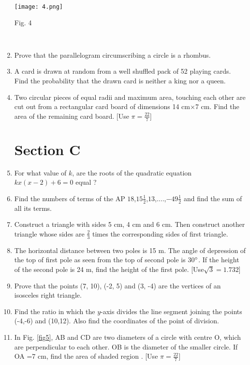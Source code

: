 \documentclass[journal,12pt,twocolumn]{IEEEtran}
\renewcommand\thesection{\arabic{section}}
\begin{document}
\begin{enumerate}[label=\thesection.\arabic*.,ref=\thesection.\theenumi]
\texttt{[image: 4.png]}\\{\centering
\caption{Fig. 4}\\}
\label{fig4}
\item Prove that the parallelogram circumscribing a circle is a rhombus.
\item A card is drawn at random from a well shuffled pack of 52 playing cards. Find the probability that the drawn card is neither a king nor a queen.
\item Two circular pieces of equal radii and maximum area, touching each other are cut out from a rectangular card board of dimensions 14 cm$\times$7 cm. Find the area of the remaining card board. [Use $\pi = \frac{22}{7}$]
\section{Section C}
\item For what value of $k$, are the roots of the quadratic equation $kx (x-2) + 6 = 0$ equal ?
\item Find the numbers of terms of the AP $18$,$15\frac{1}{2}$,$13$,....,$-49\frac{1}{2}$ and find the sum of all its terms.
\item Construct a triangle with sides 5 cm, 4 cm and 6 cm. Then construct another triangle whose sides are $\frac{2}{3}$ times the corresponding sides of first triangle.
\item The horizontal distance between two poles is 15 m. The angle of depression of the top of first pole as seen from the top of second pole is 30$\degree$. If the height of the second pole is 24 m, find the height of the first pole. [Use$\sqrt{3}=1.732$]
\item Prove that the points (7, 10), (-2, 5) and (3, -4) are the vertices of an isosceles right triangle.
\item Find the ratio in which the $y$-axis divides the line segment joining the points (-4,-6) and (10,12). Also find the coordinates of the point of division.
\item In Fig. \ref{fig5}, AB and CD are two diameters of a circle with centre O, which are perpendicular to each other. OB is the diameter of the smaller circle. If OA =7 cm, find the area of shaded region . [Use $\pi = \frac{22}{7}$]\\


\end{enumerate}
\end{document}
